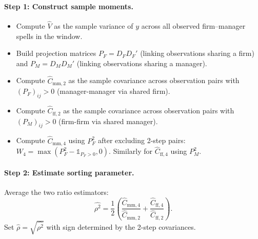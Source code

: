 \documentclass[11pt]{article}
\begin{document}
\paragraph{Step 1: Construct sample moments.}
\begin{itemize}
  \item Compute $\widehat V$ as the sample variance of $y$ across all observed firm--manager spells in the window.
  \item Build projection matrices $P_F = D_F D_F'$ (linking observations sharing a firm) and $P_M = D_M D_M'$ (linking observations sharing a manager).
  \item Compute $\widehat C_{\text{mm},2}$ as the sample covariance across observation pairs with $(P_F)_{ij}>0$ (manager-manager via shared firm).
  \item Compute $\widehat C_{\text{ff},2}$ as the sample covariance across observation pairs with $(P_M)_{ij}>0$ (firm-firm via shared manager).
  \item Compute $\widehat C_{\text{mm},4}$ using $P_F^2$ after excluding 2-step pairs: $W_4 = \max(P_F^2 - \mathbb{1}_{P_F>0}, 0)$. Similarly for $\widehat C_{\text{ff},4}$ using $P_M^2$.
\end{itemize}

\paragraph{Step 2: Estimate sorting parameter.}
Average the two ratio estimators:
\begin{equation}
 \widehat{\rho^2} = \frac{1}{2}\left(\frac{\widehat C_{\text{mm},4}}{\widehat C_{\text{mm},2}} + \frac{\widehat C_{\text{ff},4}}{\widehat C_{\text{ff},2}}\right).
\end{equation}
Set $\widehat\rho = \sqrt{\widehat{\rho^2}}$ with sign determined by the 2-step covariances.
\end{document}
